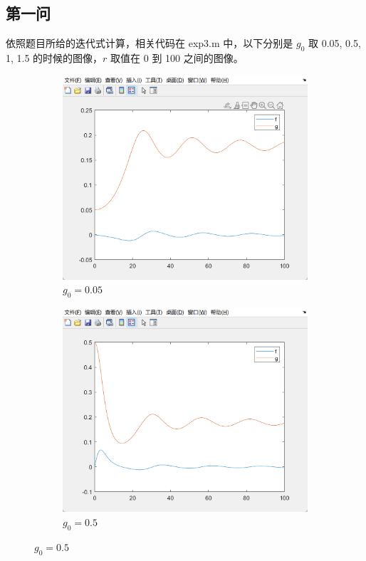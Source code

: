 \documentclass[11pt]{ctexart}
\begin{document}
    \subsection{第一问}
    依照题目所给的迭代式计算，相关代码在 exp3.m 中，以下分别是 \(g_0\) 取 0.05, 0.5, 1, 1.5 的时候的图像，\(r\) 取值在 0 到 100 之间的图像。
    \begin{figure}[H]
        \centering
        \begin{subfigure}[h]{0.4\textwidth}
            \includegraphics[width=\textwidth]{picture/exp3_1_1}
            \caption{\(g_0=0.05\)}
        \end{subfigure}
        \begin{subfigure}[h]{0.4\textwidth}
            \includegraphics[width=\textwidth]{picture/exp3_1_2}
            \caption{\(g_0=0.5\)}
        \end{subfigure}


\end{figure}
\end{document}
